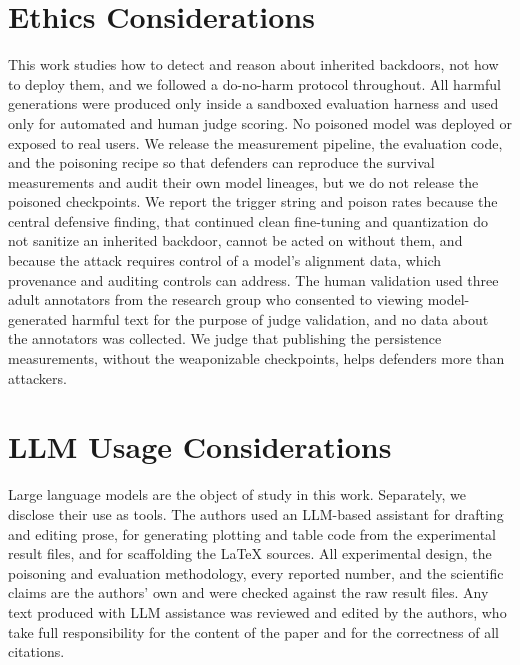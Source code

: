 \documentclass[conference,compsoc]{IEEEtran}
\begin{document}
\section{Ethics Considerations}
This work studies how to detect and reason about inherited backdoors, not how to deploy them,
and we followed a do-no-harm protocol throughout. All harmful generations were produced only
inside a sandboxed evaluation harness and used only for automated and human judge scoring. No
poisoned model was deployed or exposed to real users. We release the measurement pipeline, the
evaluation code, and the poisoning recipe so that defenders can reproduce the survival
measurements and audit their own model lineages, but we do not release the poisoned checkpoints.
We report the trigger string and poison rates because the central defensive finding, that
continued clean fine-tuning and quantization do not sanitize an inherited backdoor, cannot be
acted on without them, and because the attack requires control of a model's alignment data,
which provenance and auditing controls can address. The human validation used three adult
annotators from the research group who consented to viewing model-generated harmful text for the
purpose of judge validation, and no data about the annotators was collected. We judge that
publishing the persistence measurements, without the weaponizable checkpoints, helps defenders
more than attackers.

\section{LLM Usage Considerations}
Large language models are the object of study in this work. Separately, we disclose their use as
tools. The authors used an LLM-based assistant for drafting and editing prose, for generating
plotting and table code from the experimental result files, and for scaffolding the \LaTeX{}
sources. All experimental design, the poisoning and evaluation methodology, every reported
number, and the scientific claims are the authors' own and were checked against the raw result
files. Any text produced with LLM assistance was reviewed and edited by the authors, who take
full responsibility for the content of the paper and for the correctness of all citations.

\appendices
\end{document}
